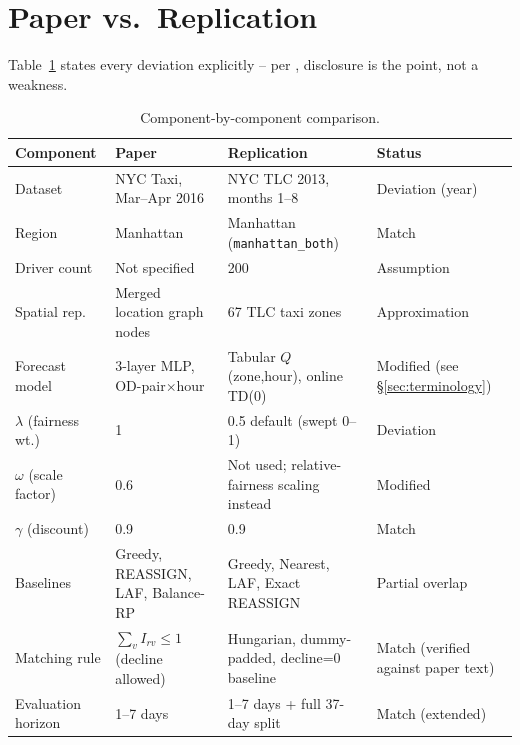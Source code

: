\documentclass[10pt,twocolumn,a4paper]{article}
\begin{document}
\section{Paper vs.\ Replication}
Table~\ref{tab:papervsrepl} states every deviation explicitly -- per
\citet{fairdispatch2024}, disclosure is the point, not a weakness.

\begin{table}[t]
\centering
\caption{Component-by-component comparison.}
\label{tab:papervsrepl}
\footnotesize
\begin{tabularx}{\textwidth}{@{}lXXl@{}}
\toprule
Component & Paper & Replication & Status \\
\midrule
Dataset & NYC Taxi, Mar--Apr 2016 & NYC TLC 2013, months 1--8 & Deviation (year) \\
Region & Manhattan & Manhattan (\texttt{manhattan\_both}) & Match \\
Driver count & Not specified & 200 & Assumption \\
Spatial rep. & Merged location graph nodes & 67 TLC taxi zones & Approximation \\
Forecast model & 3-layer MLP, OD-pair$\times$hour & Tabular $Q$(zone,hour), online TD(0) & Modified (see \S\ref{sec:terminology}) \\
$\lambda$ (fairness wt.) & 1 & 0.5 default (swept 0--1) & Deviation \\
$\omega$ (scale factor) & 0.6 & Not used; relative-fairness scaling instead & Modified \\
$\gamma$ (discount) & 0.9 & 0.9 & Match \\
Baselines & Greedy, REASSIGN, LAF, Balance-RP & Greedy, Nearest, LAF, Exact REASSIGN & Partial overlap \\
Matching rule & $\sum_v I_{rv}\le1$ (decline allowed) & Hungarian, dummy-padded, decline=0 baseline & Match (verified against paper text) \\
Evaluation horizon & 1--7 days & 1--7 days + full 37-day split & Match (extended) \\
\bottomrule
\end{tabularx}
\end{table}
\end{document}
